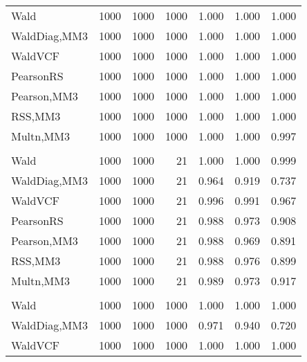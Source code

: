 \documentclass[
]{article}
\begin{document}
\begin{table}[H]
{\begin{tabular}[t]{lrrrrrr}
\hspace{1em}Wald & 1000 & 1000 & 1000 & 1.000 & 1.000 & \vphantom{1} 1.000\\
\hspace{1em}WaldDiag,MM3 & 1000 & 1000 & 1000 & 1.000 & 1.000 & 1.000\\
\hspace{1em}WaldVCF & 1000 & 1000 & 1000 & 1.000 & 1.000 & \vphantom{1} 1.000\\
\hspace{1em}PearsonRS & 1000 & 1000 & 1000 & 1.000 & 1.000 & 1.000\\
\hspace{1em}Pearson,MM3 & 1000 & 1000 & 1000 & 1.000 & 1.000 & 1.000\\
\hspace{1em}RSS,MM3 & 1000 & 1000 & 1000 & 1.000 & 1.000 & 1.000\\
\hspace{1em}Multn,MM3 & 1000 & 1000 & 1000 & 1.000 & 1.000 & 0.997\\
\addlinespace[0.3em]
\multicolumn{7}{l}{\textbf{2F 10V}}\\
\hspace{1em}Wald & 1000 & 1000 & 21 & 1.000 & 1.000 & 0.999\\
\hspace{1em}WaldDiag,MM3 & 1000 & 1000 & 21 & 0.964 & 0.919 & 0.737\\
\hspace{1em}WaldVCF & 1000 & 1000 & 21 & 0.996 & 0.991 & 0.967\\
\hspace{1em}PearsonRS & 1000 & 1000 & 21 & 0.988 & 0.973 & 0.908\\
\hspace{1em}Pearson,MM3 & 1000 & 1000 & 21 & 0.988 & 0.969 & 0.891\\
\hspace{1em}RSS,MM3 & 1000 & 1000 & 21 & 0.988 & 0.976 & 0.899\\
\hspace{1em}Multn,MM3 & 1000 & 1000 & 21 & 0.989 & 0.973 & 0.917\\
\addlinespace[0.3em]
\multicolumn{7}{l}{\textbf{3F 15V}}\\
\hspace{1em}Wald & 1000 & 1000 & 1000 & 1.000 & 1.000 & 1.000\\
\hspace{1em}WaldDiag,MM3 & 1000 & 1000 & 1000 & 0.971 & 0.940 & 0.720\\
\hspace{1em}WaldVCF & 1000 & 1000 & 1000 & 1.000 & 1.000 & 1.000\\

\end{tabular}}
\end{table}
\end{document}
